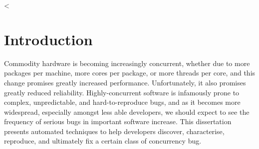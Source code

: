 <\chapter{Introduction}

\label{sect:intro:overview}

Commodity hardware is becoming increasingly concurrent, whether due to
more packages per machine, more cores per package, or more threads per
core, and this change promises greatly increased performance.
Unfortunately, it also promises greatly reduced reliability.
Highly-concurrent software is infamously prone to complex,
unpredictable, and hard-to-reproduce bugs, and as it becomes more
widespread, especially amongst less able developers, we should expect
to see the frequency of serious bugs in important software increase.
This dissertation presents automated techniques to help developers
discover, characterise, reproduce, and ultimately fix a certain class
of concurrency bug.

